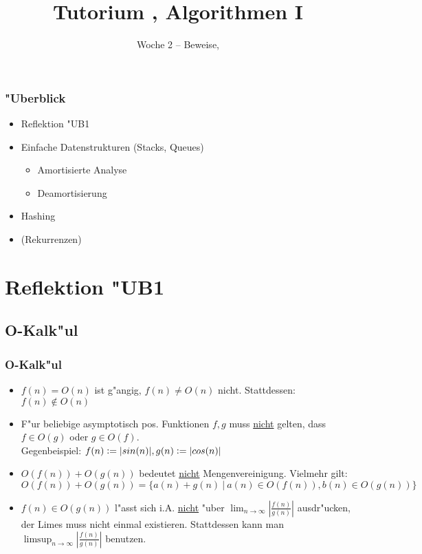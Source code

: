 

\title[Tutorium Algorithmen I]{Tutorium \tutNo, Algorithmen I}
\subtitle{Woche 2 -- Beweise, }



\begin{frame}
  \titlepage
\end{frame}

\begin{frame}
  \frametitle{"Uberblick}
  \begin{itemize}
  \item Reflektion "UB1
  \item Einfache Datenstrukturen (Stacks, Queues)
    \begin{itemize}
    \item Amortisierte Analyse
    \item Deamortisierung
    \end{itemize}
  \item Hashing
  \item (Rekurrenzen)
  \end{itemize}
\end{frame}

\section{Reflektion "UB1}
\subsection{O-Kalk"ul}
\begin{frame}
  \frametitle{O-Kalk"ul}
  \begin{itemize}
  \item $f(n) = O(n)$ ist g"angig, $f(n) \neq O(n)$ nicht. Stattdessen: $f(n) \not \in O(n)$
  \item F"ur beliebige asymptotisch pos. Funktionen $f, g$ muss \uline{nicht} gelten,
        dass $f \in O(g)$ oder $g \in O(f)$. \\
        Gegenbeispiel: $f(n) \vcentcolon= |sin(n)|, g(n) \vcentcolon= |cos(n)|$
  \item $O(f(n)) + O(g(n))$ bedeutet \uline{nicht} Mengenvereinigung. Vielmehr gilt:
        $O(f(n)) + O(g(n)) = \{ a(n) + g(n) \ |\  a(n) \in O(f(n)), b(n) \in O(g(n)) \}$
  \item $f(n) \in O(g(n))$ l"asst sich i.A. \uline{nicht} "uber
        $\lim_{n \rightarrow \infty} |\frac{f(n)}{g(n)}|$
        ausdr"ucken, der Limes muss nicht einmal existieren.
        Stattdessen kann man $\limsup_{n \rightarrow \infty} |\frac{f(n)}{g(n)}|$ benutzen.
  \end{itemize}
\end{frame}

